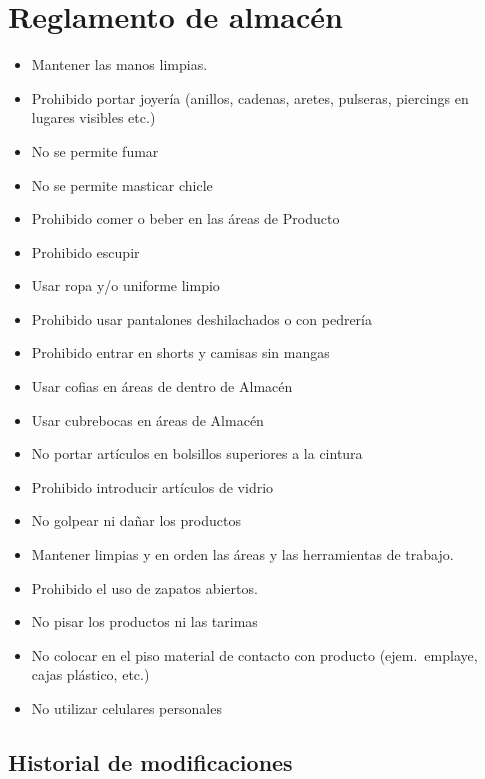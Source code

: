 \renewcommand{\Codigo}{BPD-PROG}
\renewcommand{\FechaPub}{2023-01}
\renewcommand{\Edit}{03}
\renewcommand{\Titulo}{Reglamento de almacén}
\section{\Titulo}

\begin{itemize}
	\item Mantener las manos limpias.
	\item Prohibido portar joyería (anillos, cadenas, aretes, pulseras, piercings en lugares visibles etc.)
	\item No se permite fumar
	\item No se permite masticar chicle
	\item Prohibido comer o beber en las áreas de Producto
	\item Prohibido escupir
	\item Usar ropa y/o uniforme limpio
	\item Prohibido usar pantalones deshilachados o con pedrería
	\item Prohibido entrar en shorts y camisas sin mangas
	\item Usar cofias en áreas de dentro de Almacén
	\item Usar cubrebocas en áreas de Almacén
	\item No portar artículos en bolsillos superiores a la cintura
	\item Prohibido introducir artículos de vidrio
	\item No golpear ni dañar los productos
	\item Mantener limpias y en orden las áreas y las herramientas de trabajo.
	\item Prohibido el uso de zapatos abiertos.
	\item No pisar los productos ni las tarimas
	\item No colocar en el piso material de contacto con producto (ejem.\ emplaye, cajas plástico, etc.)
	\item No utilizar celulares personales
\end{itemize}

\subsection{Historial de modificaciones}

